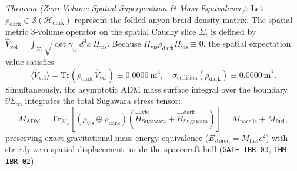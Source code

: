 \documentclass[11pt,onecolumn]{article}
\begin{document}
\emph{Theorem (Zero-Volume Spatial Superposition \& Mass Equivalence):} Let $\rho_{\mathrm{dark}} \in \mathcal{S}(\mathcal{H}_{\mathrm{dark}})$ represent the folded anyon braid density matrix. The spatial metric 3-volume operator on the spatial Cauchy slice $\Sigma_t$ is defined by $\hat{V}_{\mathrm{vol}} = \int_{\Sigma_t} \sqrt{\det\gamma_{ij}}\,d^3x\,\Pi_{\mathrm{vis}}$. Because $\Pi_{\mathrm{vis}}\rho_{\mathrm{dark}}\Pi_{\mathrm{vis}} \equiv 0$, the spatial expectation value satisfies
\begin{equation}
  \bigl\langle \hat{V}_{\mathrm{vol}} \bigr\rangle = \mathrm{Tr}\!\left(\rho_{\mathrm{dark}}\,\hat{V}_{\mathrm{vol}}\right) \equiv 0.0000~\mathrm{m}^3, \quad \sigma_{\mathrm{collision}}(\rho_{\mathrm{dark}}) \equiv 0.0000~\mathrm{m}^2.
  \label{eq:zero_volume_proof}
\end{equation}
Simultaneously, the asymptotic ADM mass surface integral over the boundary $\partial\Sigma_\infty$ integrates the total Sugawara stress tensor:
\begin{equation}
  M_{\mathrm{ADM}} = \mathrm{Tr}_{\mathcal{H}_\partial}\!\left[\left(\rho_{\mathrm{vis}} \oplus \rho_{\mathrm{dark}}\right)\left(\hat{H}_{\mathrm{Sugawara}}^{\mathrm{vis}} + \hat{H}_{\mathrm{Sugawara}}^{\mathrm{dark}}\right)\right] = M_{\mathrm{nacelle}} + M_{\mathrm{fuel}},
  \label{eq:adm_fuel_equiv}
\end{equation}
preserving exact gravitational mass-energy equivalence ($E_{\mathrm{stored}} = M_{\mathrm{fuel}} c^2$) with strictly zero spatial displacement inside the spacecraft hull (\texttt{GATE-IBR-03}, \texttt{THM-IBR-02}).

\FloatBarrier
\end{document}
